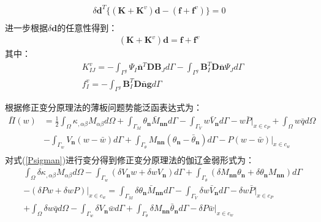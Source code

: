 \begin{equation}
\begin{split}
   \delta\pmb{d}^T\{(\pmb{K}+\pmb{K}^v)\pmb{d}-(\pmb{f}+\pmb{f}^v)\}=0\\
\end{split}
\end{equation}
进一步根据$\delta\pmb{d}$的任意性得到：
\begin{equation}
\begin{split}
    (\pmb{K}+\pmb{K}^v)\pmb{d}=\pmb{f}+\pmb{f}^v
\end{split}
\end{equation}
其中：
\begin{equation}
\begin{split}
&K^v_{IJ}=-\int_{\Gamma^g}\Psi_I\bar{\pmb{n}}^T\pmb{D}\pmb{B}_Jd\Gamma-\int_{\Gamma^g}\pmb{B}_I^T\pmb{D}\bar{\pmb{n}}\Psi_Jd\Gamma\\
&f^v_I=-\int_{\Gamma^g}\pmb{B}_I^T\pmb{D}\bar{\pmb{n}}\pmb{g}d\Gamma
\end{split}
\end{equation}\par
根据\cite{}修正变分原理法的薄板问题势能泛函表达式为：
\begin{equation}\label{Psigman}
\begin{split}
    \bar{\Pi}(w)&=\frac{1}{2}\int_{\Omega}\kappa_{,\alpha\beta}M_{\alpha\beta}d\Omega+\int_{\Gamma_M}\theta_{\pmb{n}}\bar{M}_{\pmb{nn}}d\Gamma-\int_{\Gamma_V}w\bar{V}_{\pmb{n}}d\Gamma-w\bar{P}\vert_{x\in c_P}+\int_{\Omega}w\bar{q}d\Omega\\
    &-\int_{\Gamma_w}V_{\pmb{n}}(w-\bar{w})d\Gamma+\int_{\Gamma_{\theta}}M_{\pmb{nn}}(\theta_{\pmb{n}}-\bar{\theta}_{\pmb{n}})d\Gamma-P(w-\bar{w})\vert_{x\in c_w}\\
\end{split}
\end{equation}
对式(\ref{Psigman})进行变分得到修正变分原理法的伽辽金弱形式为：
\begin{equation}
    \begin{split}
    &\int_{\Omega}\delta\kappa_{,\alpha\beta}M_{\alpha\beta}d\Omega-\int_{\Gamma_w}(\delta V_{\pmb{n}}w+\delta wV_{\pmb{n}})d\Gamma+\int_{\Gamma_{\theta}}(\delta M_{\pmb{nn}}\theta_{\pmb{n}}+\delta\theta_{\pmb{n}}M_{\pmb{nn}})d\Gamma\\
    &-(\delta Pw+\delta wP)\vert_{x\in c_w}
    =\int_{\Gamma_M}\delta\theta_{\pmb{n}}\bar{M}_{\pmb{nn}}d\Gamma-\int_{\Gamma_V}\delta w\bar{V}_{\pmb{n}}d\Gamma-\delta w\bar{P}\vert_{x\in c_P}\\
    &+\int_{\Omega}\delta w\bar{q}d\Omega
    -\int_{\Gamma_w}\delta V_{\pmb{n}}\bar{w}d\Gamma+\int_{\Gamma_{\theta}}\delta M_{\pmb{nn}}\bar{\theta}_{\pmb{n}}d\Gamma-\delta P\bar{w}\vert_{x\in c_w}
\end{split}
\end{equation}\par
